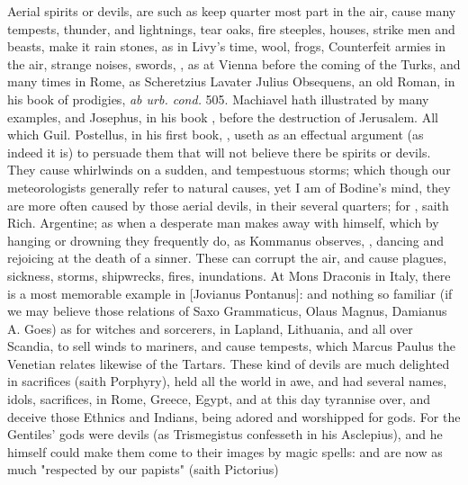 Aerial spirits or devils, are such as keep quarter most part in the
air, cause many tempests, thunder, and lightnings, tear
oaks, fire steeples, houses, strike men and beasts, make it rain stones, as in
Livy's time, wool, frogs, \etc{} Counterfeit armies in the air, strange noises,
swords, \etc{}, as at Vienna before the coming of the Turks, and many times in
Rome, as Scheretzius  Lavater
 Julius Obsequens, an old
Roman, in his book of prodigies, \emph{ab urb. cond.} 505.
Machiavel hath illustrated by many examples, and Josephus,
in his book , before the destruction of
Jerusalem. All which Guil. Postellus, in his first book,
, useth as an effectual argument
(as indeed it is) to persuade them that will not believe there be spirits or
devils. They cause whirlwinds on a sudden, and tempestuous storms; which though
our meteorologists generally refer to natural causes, yet I am of Bodine's
mind,  they are more often caused by
those aerial devils, in their several quarters; for , saith Rich. Argentine; as when a desperate man
makes away with himself, which by hanging or drowning they frequently do, as
Kommanus observes, 
, dancing and rejoicing at the death of a sinner. These
can corrupt the air, and cause plagues, sickness, storms, shipwrecks, fires,
inundations. At Mons Draconis in Italy, there is a most memorable example in
[Jovianus Pontanus]: and nothing so familiar (if we may
believe those relations of Saxo Grammaticus, Olaus Magnus, Damianus A. Goes) as
for witches and sorcerers, in Lapland, Lithuania, and all over Scandia, to sell
winds to mariners, and cause tempests, which Marcus Paulus the Venetian relates
likewise of the Tartars. These kind of devils are much
delighted in sacrifices (saith Porphyry), held all the
world in awe, and had several names, idols, sacrifices, in Rome, Greece, Egypt,
and at this day tyrannise over, and deceive those Ethnics and Indians, being
adored and worshipped for gods. For the Gentiles' gods
were devils (as Trismegistus confesseth in his Asclepius),
and he himself could make them come to their images by magic spells: and are
now as much "respected by our papists" (saith Pictorius)
